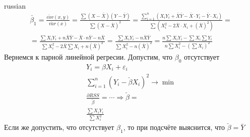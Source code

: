 \documentclass{article}
\begin{document}
\begin{otherlanguage*}{russian}
\begin{align}
\check{\beta_1} = \frac{\check{cov} (x, y)}{\check{var} (x)}  = \frac{\sum (X - \bar{X}) (Y - \bar{Y})}{\sum (X - \bar{X})^2} = 
\frac{
\sum_{i=1}^n (X_i Y_i + \bar{X} \bar{Y} - \bar{X} \cdot Y_i - \bar{Y} \cdot X_i) 
}
{\sum (X_i ^ 2 - 2 \bar{X} \cdot X_i + (\bar{X}) ^ 2)} = \\ = \frac{\sum X_i Y_i + n \bar{X} \bar{Y} - \bar{X} \cdot n \bar{Y} - n \bar{X}}{\sum X_i ^ 2 - 2 \bar{X} \sum X_i + n (\bar{X}) ^ 2} = \frac{\sum X_i Y_i - n \bar{X} \bar{Y}}{\sum X_i^2 - n (\bar{X})^2} = \frac{n \sum X_i Y_i - \sum X_i \sum Y_i}{n \sum X_i^2 - (\sum X_i) ^ 2 }
\end{align}
Вернемся к парной линейной регресии. Допустим, что $ \beta_0 $ отсутствует 
\begin{align}
Y_i = \beta X_i + \varepsilon_i \\
\sum_{i=1}^n (Y_i - \check{\beta} X_i)^2 \rightarrow \min \\
\frac{\partial RSS}{\check{\beta}} = \cdots \Rightarrow \check{\beta} = \\
\frac{\sum X_i Y_i}{\sum X_i^2}
\end{align}
Если же допустить, что отсутствует $ \beta_1$, то при подсчёте выяснится, что $\check{\beta} = \bar{Y} $ 
\end{otherlanguage*}
\end{document}
